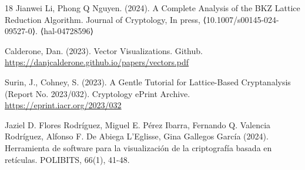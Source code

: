 \documentclass[runningheads]{llncs}
\begin{document}
\begin{thebibliography}{18}
Jianwei Li, Phong Q Nguyen. (2024). A Complete Analysis of the BKZ Lattice Reduction Algorithm. Journal of
Cryptology, In press, ⟨10.1007/s00145-024-09527-0⟩. ⟨hal-04728596⟩

Calderone, Dan. (2023). Vector Visualizations. Github. 
\url{https://danjcalderone.github.io/papers/vectors.pdf}

Surin, J., Cohney, S. (2023). A Gentle Tutorial for Lattice-Based Cryptanalysis (Report No. 2023/032). Cryptology ePrint Archive. 
\url {https://eprint.iacr.org/2023/032}

Jaziel D. Flores Rodríguez, Miguel E. Pérez Ibarra, Fernando Q. Valencia Rodríguez, Alfonso F. De Abiega L'Eglisse,  Gina Gallegos García (2024). Herramienta de software para la visualización de la criptografía basada en retículas. POLIBITS, 66(1), 41-48.

\end{thebibliography}

%

%
%
%
% 
% 
%
\end{document}
